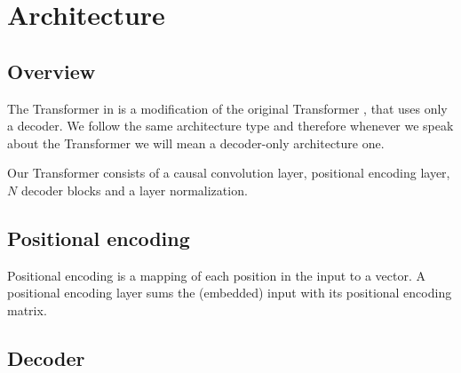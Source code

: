 \documentclass[en]{pracamgr}
\begin{document}
%


\section{Architecture}

\subsection{Overview}

The Transformer in \cite{enhancing} is a modification of the original Transformer \cite{tr}, that uses only a decoder.
We follow the same architecture type and therefore whenever we speak about the Transformer we will mean a decoder-only \cite{wikipedia} architecture one.

Our Transformer consists of a causal convolution layer, positional encoding layer, $N$ decoder blocks and a layer normalization.

\subsection{Positional encoding}

Positional encoding is a mapping of each position in the input to a vector.
A positional encoding layer sums the (embedded) input with its positional encoding matrix.

\subsection{Decoder}
\end{document}
